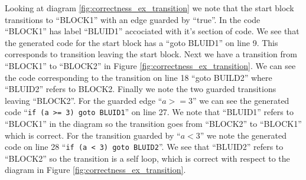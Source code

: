 Looking at diagram \ref{fig:correctness_ex_transition} we note that the start block transitions to ``BLOCK1'' with an edge guarded by ``true''. In the code ``BLOCK1'' has label ``BLUID1'' accociated with it's section of code. We see that the generated code for the start block has a ``goto BLUID1'' on line 9. This corresponds to transition leaving the start block. Next we have a transition from ``BLOCK1'' to ``BLOCK2'' in Figure \ref{fig:correctness_ex_transition}. We can see the code corresponding to the transition on line 18 ``goto BUILD2'' where ``BLUID2'' refers to BLOCK2. Finally we note the two guarded transitions leaving ``BLOCK2''. For the guarded edge ``$a >= 3$'' we can see the generated code ``\texttt{if (a >= 3) goto BLUID1}'' on line 27. We note that ``BLUID1'' refers to ``BLOCK1'' in the diagram so the transition goes from ``BLOCK2'' to ``BLOCK1'' which is correct. For the transition guarded by ``$a < 3$'' we note the generated code on line 28 ``\texttt{if (a < 3) goto BLUID2}''. We see that ``BLUID2'' refers to ``BLOCK2'' so the transition is a self loop, which is correct with respect to the diagram in Figure \ref{fig:correctness_ex_transition}.





